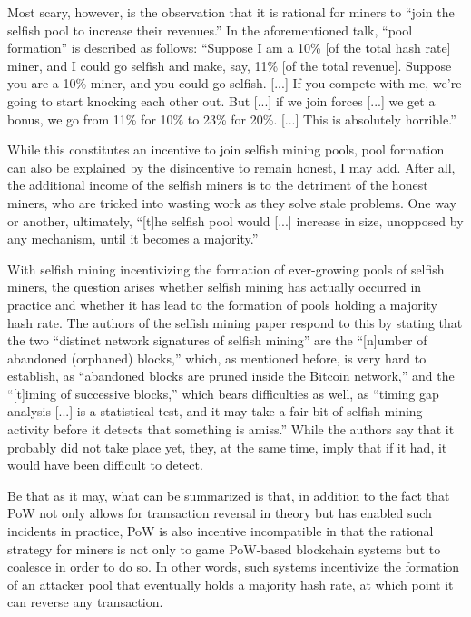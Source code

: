 Most scary, however, is the observation that it is rational for miners to  ``join the selfish pool to increase their revenues.''
In the aforementioned talk, ``pool formation'' is described as follows:
``Suppose I am a 10\% [of the total hash rate] miner, and I could go selfish and make, say, 11\% [of the total revenue].
Suppose you are a 10\% miner, and you could go selfish. [...]
If you compete with me, we're going to start knocking each other out.
But [...] if we join forces [...] we get a bonus, we go from 11\% for 10\% to 23\% for 20\%. [...]
This is absolutely horrible.''

While this constitutes an incentive to join selfish mining pools, pool formation can also be explained by the disincentive to remain honest, I may add.
After all, the additional income of the selfish miners is to the detriment of the honest miners, who are tricked into wasting work as they solve stale problems.
One way or another, ultimately, ``[t]he selfish pool would [...] increase in size, unopposed by any mechanism, until it becomes a majority.''

With selfish mining incentivizing the formation of ever-growing pools of selfish miners, the question arises whether selfish mining has actually occurred in practice and whether it has lead to the formation of pools holding a majority hash rate.
The authors of the selfish mining paper respond to this \autocite{hackingd2014detectsm} by stating that the two ``distinct network signatures of selfish mining'' are the ``[n]umber of abandoned (orphaned) blocks,'' which, as mentioned before, is very hard to establish, as ``abandoned blocks are pruned inside the Bitcoin network,'' and the ``[t]iming of successive blocks,'' which bears difficulties as well, as ``timing gap analysis [...] is a statistical test, and it may take a fair bit of selfish mining activity before it detects that something is amiss.''
While the authors say that it probably did not take place yet, they, at the same time, imply that if it had, it would have been difficult to detect.

Be that as it may, what can be summarized is that, in addition to the fact that PoW not only allows for transaction reversal in theory but has enabled such incidents in practice, PoW is also incentive incompatible in that the rational strategy for miners is not only to game PoW-based blockchain systems but to coalesce in order to do so.
In other words, such systems incentivize the formation of an attacker pool that eventually holds a majority hash rate, at which point it can reverse any transaction.

